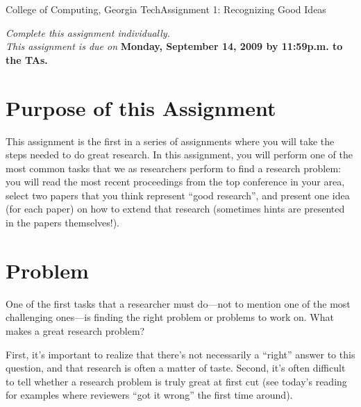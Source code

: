 \documentclass[11pt]{article}
\begin{document}


{College of Computing, Georgia Tech}{Assignment 1: Recognizing Good Ideas}

{\em Complete this assignment individually. \\ This assignment is due
  on} {\bf Monday, September 14, 2009 by 11:59p.m. to the TAs.}

\section{Purpose of this Assignment}

This assignment is the first in a series of assignments where you will
take the steps needed to do great research.  In this assignment, you
will perform one of the most common tasks that we as researchers perform
to find a research problem: you will read the most recent proceedings
from the top conference in your area, select two papers that you think
represent ``good research'', and present one idea (for each paper) on
how to extend that research (sometimes hints are presented in the papers
themselves!).


\section{Problem}


One of the first tasks that a researcher must do---not to mention one of
the most challenging ones---is finding the right problem or problems to
work on.  What makes a great research problem?  

First, it's important to realize that there's not necessarily a
``right'' answer to this question, and that research is often a matter
of taste.  Second, it's often difficult to tell whether a research
problem is truly great at first cut (see today's reading for examples
where reviewers ``got it wrong'' the first time around).
\end{document}
